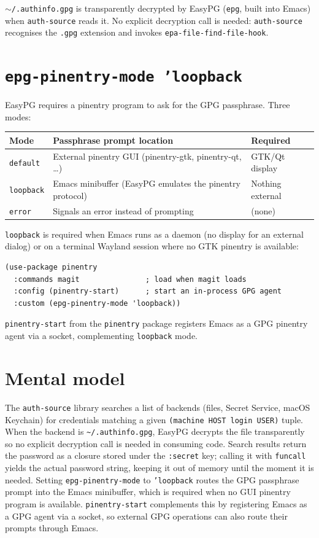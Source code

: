 \texttt{$\sim$/.authinfo.gpg} is transparently decrypted by EasyPG (\texttt{epg}, built into Emacs) when \texttt{auth-source} reads it. No explicit decryption call is needed: \texttt{auth-source} recognises the \texttt{.gpg} extension and invokes \texttt{epa-file-find-file-hook}.

\section{\texttt{epg-pinentry-mode 'loopback}}\label{epg-pinentry-mode-loopback}

EasyPG requires a pinentry program to ask for the GPG passphrase. Three modes:

\begin{longtable}[]{@{}lll@{}}
\toprule
Mode & Passphrase prompt location & Required \\
\midrule
\texttt{default} & External pinentry GUI (pinentry-gtk, pinentry-qt, \ldots) & GTK/Qt display \\
\texttt{loopback} & Emacs minibuffer (EasyPG emulates the pinentry protocol) & Nothing external \\
\texttt{error} & Signals an error instead of prompting & (none) \\
\bottomrule
\end{longtable}

\texttt{loopback} is required when Emacs runs as a daemon (no display for an external dialog) or on a terminal Wayland session where no GTK pinentry is available:

\begin{verbatim}
(use-package pinentry
  :commands magit               ; load when magit loads
  :config (pinentry-start)      ; start an in-process GPG agent
  :custom (epg-pinentry-mode 'loopback))
\end{verbatim}

\texttt{pinentry-start} from the \texttt{pinentry} package registers Emacs as a GPG pinentry agent via a socket, complementing \texttt{loopback} mode.

\section{Mental model}
The \texttt{auth-source} library searches a list of backends (files, Secret
Service, macOS Keychain) for credentials matching a given
\texttt{(machine HOST login USER)} tuple.  When the backend is
\texttt{\~{}/.authinfo.gpg}, EasyPG decrypts the file transparently so no
explicit decryption call is needed in consuming code.  Search results return
the password as a closure stored under the \texttt{:secret} key; calling it
with \texttt{funcall} yields the actual password string, keeping it out of
memory until the moment it is needed.  Setting \texttt{epg-pinentry-mode} to
\texttt{'loopback} routes the GPG passphrase prompt into the Emacs
minibuffer, which is required when no GUI pinentry program is available.
\texttt{pinentry-start} complements this by registering Emacs as a GPG agent
via a socket, so external GPG operations can also route their prompts through
Emacs.
